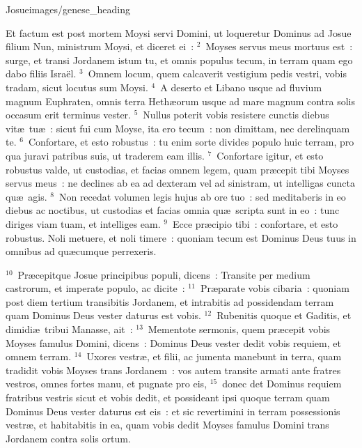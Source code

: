 {Josue}{images/genese_heading}


\lettrine[lines=6,image=true,loversize=0.05,lraise=-0.03]{E}{}t factum est post mortem Moysi servi Domini, ut loqueretur Dominus ad Josue filium Nun, ministrum Moysi, et diceret ei~:
${}^{2}$~Moyses servus meus mortuus est~: surge, et transi Jordanem istum tu, et omnis populus tecum, in terram quam ego dabo filiis Isra\"el.
${}^{3}$~Omnem locum, quem calcaverit vestigium pedis vestri, vobis tradam, sicut locutus sum Moysi.
${}^{4}$~A deserto et Libano usque ad fluvium magnum Euphraten, omnis terra Heth\ae orum usque ad mare magnum contra solis occasum erit terminus vester.
${}^{5}$~Nullus poterit vobis resistere cunctis diebus vit\ae\ tu\ae~: sicut fui cum Moyse, ita ero tecum~: non dimittam, nec derelinquam te.
${}^{6}$~Confortare, et esto robustus~: tu enim sorte divides populo huic terram, pro qua juravi patribus suis, ut traderem eam illis.
${}^{7}$~Confortare igitur, et esto robustus valde, ut custodias, et facias omnem legem, quam pr\ae cepit tibi Moyses servus meus~: ne declines ab ea ad dexteram vel ad sinistram, ut intelligas cuncta qu\ae\ agis.
${}^{8}$~Non recedat volumen legis hujus ab ore tuo~: sed meditaberis in eo diebus ac noctibus, ut custodias et facias omnia qu\ae\ scripta sunt in eo~: tunc diriges viam tuam, et intelliges eam.
${}^{9}$~Ecce pr\ae cipio tibi~: confortare, et esto robustus. Noli metuere, et noli timere~: quoniam tecum est Dominus Deus tuus in omnibus ad qu\ae cumque perrexeris.


${}^{10}$~Pr\ae cepitque Josue principibus populi, dicens~: Transite per medium castrorum, et imperate populo, ac dicite~:
${}^{11}$~Pr\ae parate vobis cibaria~: quoniam post diem tertium transibitis Jordanem, et intrabitis ad possidendam terram quam Dominus Deus vester daturus est vobis.
${}^{12}$~Rubenitis quoque et Gaditis, et dimidi\ae\ tribui Manasse, ait~:
${}^{13}$~Mementote sermonis, quem pr\ae cepit vobis Moyses famulus Domini, dicens~: Dominus Deus vester dedit vobis requiem, et omnem terram.
${}^{14}$~Uxores vestr\ae , et filii, ac jumenta manebunt in terra, quam tradidit vobis Moyses trans Jordanem~: vos autem transite armati ante fratres vestros, omnes fortes manu, et pugnate pro eis,
${}^{15}$~donec det Dominus requiem fratribus vestris sicut et vobis dedit, et possideant ipsi quoque terram quam Dominus Deus vester daturus est eis~: et sic revertimini in terram possessionis vestr\ae , et habitabitis in ea, quam vobis dedit Moyses famulus Domini trans Jordanem contra solis ortum.


